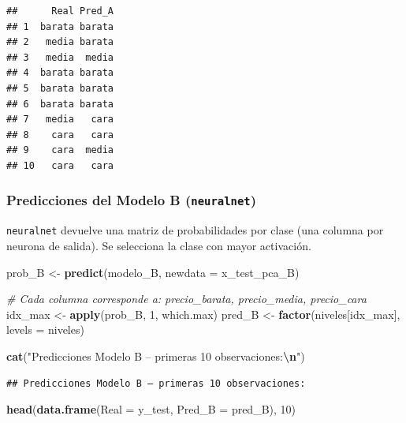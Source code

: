 \documentclass[
]{article}
\newenvironment{Shaded}{\begin{snugshade}}{\end{snugshade}}
\newcommand{\AttributeTok}[1]{\textcolor[rgb]{0.13,0.29,0.53}{#1}}
\newcommand{\CommentTok}[1]{\textcolor[rgb]{0.56,0.35,0.01}{\textit{#1}}}
\newcommand{\DecValTok}[1]{\textcolor[rgb]{0.00,0.00,0.81}{#1}}
\newcommand{\FunctionTok}[1]{\textcolor[rgb]{0.13,0.29,0.53}{\textbf{#1}}}
\newcommand{\NormalTok}[1]{#1}
\newcommand{\OtherTok}[1]{\textcolor[rgb]{0.56,0.35,0.01}{#1}}
\newcommand{\SpecialCharTok}[1]{\textcolor[rgb]{0.81,0.36,0.00}{\textbf{#1}}}
\newcommand{\StringTok}[1]{\textcolor[rgb]{0.31,0.60,0.02}{#1}}
\begin{document}
\begin{verbatim}
##      Real Pred_A
## 1  barata barata
## 2   media barata
## 3   media  media
## 4  barata barata
## 5  barata barata
## 6  barata barata
## 7   media   cara
## 8    cara   cara
## 9    cara  media
## 10   cara   cara
\end{verbatim}

\hypertarget{predicciones-del-modelo-b-neuralnet}{%
\subsubsection{\texorpdfstring{Predicciones del Modelo B
(\texttt{neuralnet})}{Predicciones del Modelo B (neuralnet)}}\label{predicciones-del-modelo-b-neuralnet}}

\texttt{neuralnet} devuelve una matriz de probabilidades por clase (una
columna por neurona de salida). Se selecciona la clase con mayor
activación.

\begin{Shaded}
\begin{Highlighting}[]
\NormalTok{prob\_B }\OtherTok{\textless{}{-}} \FunctionTok{predict}\NormalTok{(modelo\_B, }\AttributeTok{newdata =}\NormalTok{ x\_test\_pca\_B)}

\CommentTok{\# Cada columna corresponde a: precio\_barata, precio\_media, precio\_cara}
\NormalTok{idx\_max }\OtherTok{\textless{}{-}} \FunctionTok{apply}\NormalTok{(prob\_B, }\DecValTok{1}\NormalTok{, which.max)}
\NormalTok{pred\_B  }\OtherTok{\textless{}{-}} \FunctionTok{factor}\NormalTok{(niveles[idx\_max], }\AttributeTok{levels =}\NormalTok{ niveles)}

\FunctionTok{cat}\NormalTok{(}\StringTok{"Predicciones Modelo B – primeras 10 observaciones:}\SpecialCharTok{\textbackslash{}n}\StringTok{"}\NormalTok{)}
\end{Highlighting}
\end{Shaded}

\begin{verbatim}
## Predicciones Modelo B – primeras 10 observaciones:
\end{verbatim}

\begin{Shaded}
\begin{Highlighting}[]
\FunctionTok{head}\NormalTok{(}\FunctionTok{data.frame}\NormalTok{(}\AttributeTok{Real =}\NormalTok{ y\_test, }\AttributeTok{Pred\_B =}\NormalTok{ pred\_B), }\DecValTok{10}\NormalTok{)}
\end{Highlighting}
\end{Shaded}
\end{document}
